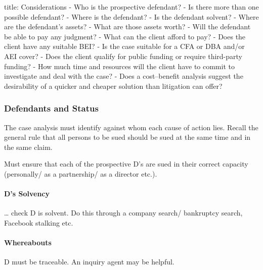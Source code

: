 \documentclass[
]{article}
\newenvironment{Shaded}{}{}
\newcommand{\NormalTok}[1]{#1}
\begin{document}
\begin{Shaded}
\begin{Highlighting}[]
\NormalTok{title: Considerations}
\NormalTok{{-} Who is the prospective defendant?}
\NormalTok{{-} Is there more than one possible defendant?}
\NormalTok{{-} Where is the defendant?}
\NormalTok{{-} Is the defendant solvent?}
\NormalTok{{-} Where are the defendant’s assets?}
\NormalTok{{-} What are those assets worth?}
\NormalTok{{-} Will the defendant be able to pay any judgment?}
\NormalTok{{-} What can the client afford to pay?}
\NormalTok{{-} Does the client have any suitable BEI?}
\NormalTok{{-} Is the case suitable for a CFA or DBA and/or AEI cover?}
\NormalTok{{-} Does the client qualify for public funding or require third{-}party funding?}
\NormalTok{{-} How much time and resources will the client have to commit to investigate and deal}
\NormalTok{with the case?}
\NormalTok{{-} Does a cost–benefit analysis suggest the desirability of a quicker and cheaper solution}
\NormalTok{than litigation can offer?}
\end{Highlighting}
\end{Shaded}

\hypertarget{defendants-and-status}{%
\subsubsection{Defendants and Status}\label{defendants-and-status}}

The case analysis must identify against whom each cause of action lies.
Recall the general rule that all persons to be sued should be sued at
the same time and in the same claim.

Must ensure that each of the prospective D's are sued in their correct
capacity (personally/ as a partnership/ as a director etc.).

\hypertarget{ds-solvency}{%
\paragraph{D's Solvency}\label{ds-solvency}}

\ldots{} check D is solvent. Do this through a company search/
bankruptcy search, Facebook stalking etc.

\hypertarget{whereabouts}{%
\paragraph{Whereabouts}\label{whereabouts}}

D must be traceable. An inquiry agent may be helpful.
\end{document}
